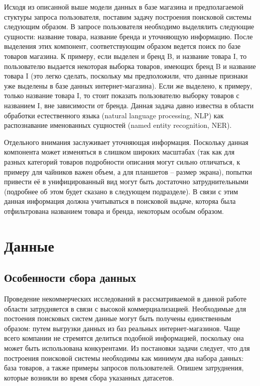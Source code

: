 \documentclass[12pt,a4paper]{article}
\begin{document}
Исходя из описанной выше модели данных в базе магазина и предполагаемой стуктуры запроса пользователя, поставим задачу построения поисковой системы следующим образом. В запросе пользователя необходимо выделялить следующие сущности: название товара, название бренда и уточняющую информацию. После выделения этих компонент, соответствующим образом ведется поиск по базе товаров магазина. К примеру, если выделен и бренд B, и название товара I, то пользователю выдается некоторая выборка товаров, имеющих бренд B и название товара I (это легко сделать, поскольку мы предположили, что данные признаки уже выделены в базе данных интернет-магазина). Если же выделено, к примеру, только название товара I, то стоит показать пользователю выборку товаров с названием I, вне зависимости от бренда. Данная задача давно известна в области обработки естественного языка (natural language processing, NLP) как распознавание именованных сущностей (named entity recognition, NER).

Отдельного внимания заслуживает уточняющая информация. Поскольку данная компонента может изменяться в слишком широких масштабах (так как для разных категорий товаров подробности описания могут сильно отличаться, к примеру для чайников важен объем, а для планшетов -- размер экрана), попытки привести её в унифицированный вид могут быть достаточно затруднительными (подробнее об этом будет сказано в следующем подразделе). В связи с этим данная информация должна учитываться в поисковой выдаче, которяа была отфильтрована названием товара и бренда, некоторым особым образом.

\section{Данные}
\subsection{Особенности сбора данных}

Проведение некоммерческих исследований в рассматриваемой в данной работе области затрудняется в связи с высокой коммерциализацией. Необходимые для постоения поисковых систем данные могут быть получены единственным образом: путем выгрузки данных из баз реальных интернет-магазинов. Чаще всего компании не стремятся делиться подобной информацией, поскольку она может быть использована конкурентами. Из постановки задачи следует, что для построения поисковой системы необходимы как минимум два набора данных: база товаров, а также примеры запросов пользователей. Опишем затруднения, которые возникли во время сбора указанных датасетов.
\end{document}
